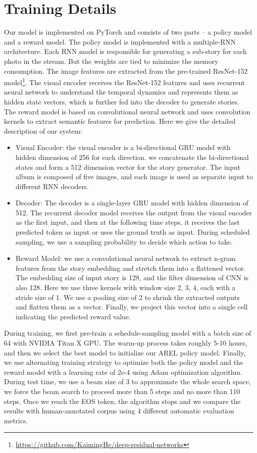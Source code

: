 \documentclass[11pt,a4paper]{article}
\begin{document}
\section{Training Details}
\label{supp:training}
Our model is implemented on PyTorch and consists of two parts -- a policy model and a reward model. The policy model is implemented with a multiple-RNN architecture. Each RNN model is responsible for generating a sub-story for each photo in the stream. But the weights are tied to minimize the memory consumption. The image features are extracted from the pre-trained ResNet-152 model\footnote{\scriptsize\url{https://github.com/KaimingHe/deep-residual-networks}}. The visual encoder receives the ResNet-152 features and uses recurrent neural network to understand the temporal dynamics and represents them as hidden state vectors, which is further fed into the decoder to generate stories. The reward model is based on convolutional neural network and uses convolution kernels to extract semantic features for prediction.
Here we give the detailed description of our system: 
\begin{itemize}
\item Visual Encoder: the visual encoder is a bi-directional GRU model with hidden dimension of 256 for each direction. we concatenate the bi-directional states and form a 512 dimension vector for the story generator. The input album is composed of five images, and each image is used as separate input to different RNN decoders.
\item Decoder: The decoder is a single-layer GRU model with hidden dimension of 512. The recurrent decoder model receives the output from the visual encoder as the first input, and then at the following time steps, it receives the last predicted token as input or uses the ground truth as input. During scheduled sampling, we use a sampling probability to decide which action to take.
\item Reward Model: we use a convolutional neural network to extract n-gram features from the story embedding and stretch them into a flattened vector. The embedding size of input story is 128, and the filter dimension of CNN is also 128. Here we use three kernels with window size 2, 3, 4, each with a stride size of 1. We use a pooling size of 2 to shrink the extracted outputs and flatten them as a vector. Finally, we project this vector into a single cell indicating the predicted reward value. 
\end{itemize}
During training, we first pre-train a schedule-sampling model with a batch size of 64 with NVIDIA Titan X GPU. The warm-up process takes roughly 5-10 hours, and then we select the best model to initialize our AREL policy model. Finally, we use alternating training strategy to optimize both the policy model and the reward model with a learning rate of 2e-4 using Adam optimization algorithm. During test time, we use a beam size of 3 to approximate the whole search space, we force the beam search to proceed more than 5 steps and no more than 110 steps. Once we reach the EOS token, the algorithm stops and we compare the results with human-annotated corpus using 4 different automatic evaluation metrics.
\end{document}
